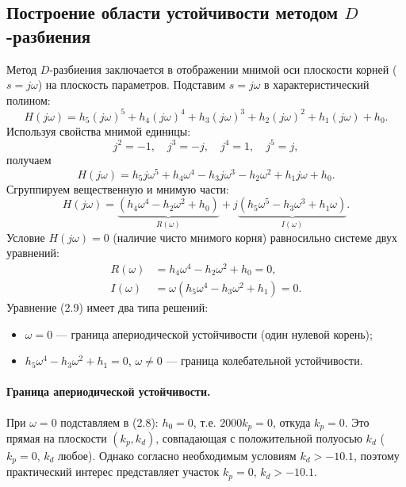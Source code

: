 \documentclass[a4paper, 14pt]{extarticle}
\begin{document}
    \subsection{Построение области устойчивости методом $D$-разбиения}
    Метод $D$-разбиения заключается в отображении мнимой оси плоскости корней ($s = j\omega$) на плоскость параметров. Подставим $s = j\omega$ в характеристический полином:
    \[
    H(j\omega) = h_5 (j\omega)^5 + h_4 (j\omega)^4 + h_3 (j\omega)^3 + h_2 (j\omega)^2 + h_1 (j\omega) + h_0.
    \]
    Используя свойства мнимой единицы:
    \[
    j^2 = -1,\quad j^3 = -j,\quad j^4 = 1,\quad j^5 = j,
    \]
    получаем
    \[
    H(j\omega) = h_5 j\omega^5 + h_4 \omega^4 - h_3 j\omega^3 - h_2 \omega^2 + h_1 j\omega + h_0.
    \]
    Сгруппируем вещественную и мнимую части:
    \[
    H(j\omega) = \underbrace{(h_4 \omega^4 - h_2 \omega^2 + h_0)}_{R(\omega)} + j\underbrace{(h_5 \omega^5 - h_3 \omega^3 + h_1 \omega)}_{I(\omega)}.
    \]
    Условие $H(j\omega) = 0$ (наличие чисто мнимого корня) равносильно системе двух уравнений:
    \begin{align}
    R(\omega) &= h_4 \omega^4 - h_2 \omega^2 + h_0 = 0, \tag{2.8}\\
    I(\omega) &= \omega (h_5 \omega^4 - h_3 \omega^2 + h_1) = 0. \tag{2.9}
    \end{align}
    Уравнение (2.9) имеет два типа решений:
    \begin{itemize}
    \item $\omega = 0$ — граница апериодической устойчивости (один нулевой корень);
    \item $h_5 \omega^4 - h_3 \omega^2 + h_1 = 0$, $\omega \neq 0$ — граница колебательной устойчивости.
    \end{itemize}

    \paragraph{Граница апериодической устойчивости.}
    При $\omega = 0$ подставляем в (2.8): $h_0 = 0$, т.е. $2000 k_p = 0$, откуда $k_p = 0$. Это прямая на плоскости $(k_p,k_d)$, совпадающая с положительной полуосью $k_d$ ($k_p=0$, $k_d$ любое). Однако согласно необходимым условиям $k_d > -10.1$, поэтому практический интерес представляет участок $k_p = 0$, $k_d > -10.1$.
\end{document}
